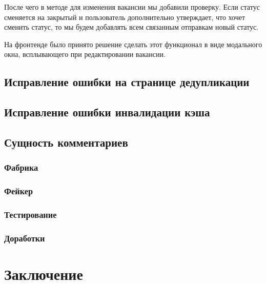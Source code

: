\documentclass[a4paper,14pt]{extarticle}
\begin{document}
После чего в методе для изменения вакансии мы добавили проверку. Если статус сменяется на закрытый и 
пользователь дополнительно утверждает, что хочет сменить статус, то мы будем добавлять всем связанным 
отправкам новый статус.

На фронтенде было принято решение сделать этот функционал в виде модального окна, всплывающего при 
редактировании вакансии. 
\subsection{Исправление ошибки на странице дедупликации}
\subsection{Исправление ошибки инвалидации кэша}
\subsection{Сущность комментариев}
\subsubsection{Фабрика}
\subsubsection{Фейкер}
\subsubsection{Тестирование}
\subsubsection{Доработки}
\section{Заключение}
\end{document}
